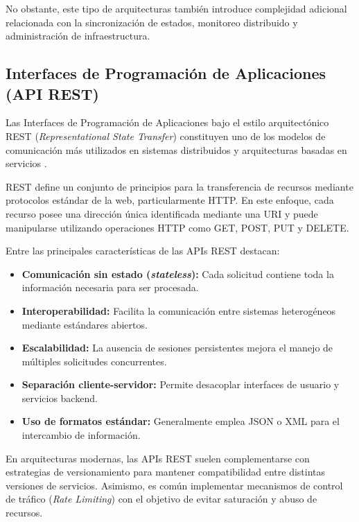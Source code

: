 No obstante, este tipo de arquitecturas también introduce complejidad adicional relacionada con la sincronización de estados, monitoreo distribuido y administración de infraestructura.

\subsection{Interfaces de Programación de Aplicaciones (API REST)}

Las Interfaces de Programación de Aplicaciones bajo el estilo arquitectónico REST (\textit{Representational State Transfer}) constituyen uno de los modelos de comunicación más utilizados en sistemas distribuidos y arquitecturas basadas en servicios \cite{54}.

REST define un conjunto de principios para la transferencia de recursos mediante protocolos estándar de la web, particularmente HTTP. En este enfoque, cada recurso posee una dirección única identificada mediante una URI y puede manipularse utilizando operaciones HTTP como GET, POST, PUT y DELETE.

Entre las principales características de las APIs REST destacan:

\begin{itemize}
\item \textbf{Comunicación sin estado (\textit{stateless}):} Cada solicitud contiene toda la información necesaria para ser procesada.

\item \textbf{Interoperabilidad:} Facilita la comunicación entre sistemas heterogéneos mediante estándares abiertos.

\item \textbf{Escalabilidad:} La ausencia de sesiones persistentes mejora el manejo de múltiples solicitudes concurrentes.

\item \textbf{Separación cliente-servidor:} Permite desacoplar interfaces de usuario y servicios backend.

\item \textbf{Uso de formatos estándar:} Generalmente emplea JSON o XML para el intercambio de información.
\end{itemize}

En arquitecturas modernas, las APIs REST suelen complementarse con estrategias de versionamiento para mantener compatibilidad entre distintas versiones de servicios. Asimismo, es común implementar mecanismos de control de tráfico (\textit{Rate Limiting}) con el objetivo de evitar saturación y abuso de recursos.

